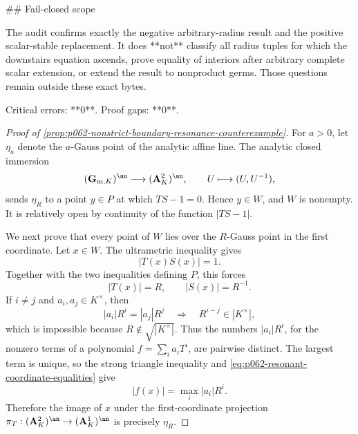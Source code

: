 ## Fail-closed scope

The audit confirms exactly the negative arbitrary-radius result and the
positive scalar-stable replacement. It does **not** classify all radius
tuples for which the downstairs equation ascends, prove equality of
interiors after arbitrary complete scalar extension, or extend the result
to nonproduct germs. Those questions remain outside these exact bytes.

Critical errors: **0**. Proof gaps: **0**.


\begin{proof}[Proof of
\cref{prop:p062-nonstrict-boundary-resonance-counterexample}]
For \(a>0\), let \(\eta_a\) denote the \(a\)-Gauss point of the analytic
affine line.  The analytic closed immersion
\[
 (\mathbf G_{\mathrm m,K})^{\an}\longrightarrow(\mathbf A^2_K)^{\an},
             \qquad U\longmapsto(U,U^{-1}),
\]
sends \(\eta_R\) to a point \(y\in P\) at which \(TS-1=0\).  Hence
\(y\in W\), and \(W\) is nonempty.  It is relatively open by continuity
of the function \(|TS-1|\).

We next prove that every point of \(W\) lies over the \(R\)-Gauss point in
the first coordinate.  Let \(x\in W\).  The ultrametric inequality gives
\[
                         |T(x)S(x)|=1.
\]
Together with the two inequalities defining \(P\), this forces
\begin{equation}\label{eq:p062-resonant-coordinate-equalities}
                         |T(x)|=R,
                         \qquad |S(x)|=R^{-1}.
\end{equation}
If \(i\ne j\) and \(a_i,a_j\in K^\times\), then
\[
 |a_i|R^i=|a_j|R^j
       \quad\Longrightarrow\quad
 R^{i-j}\in|K^\times|,
\]
which is impossible because \(R\notin\sqrt{|K^\times|}\).  Thus the
numbers \(|a_i|R^i\), for the nonzero terms of a polynomial
\(f=\sum_i a_iT^i\), are pairwise distinct.  The largest term is unique,
so the strong triangle inequality and
\eqref{eq:p062-resonant-coordinate-equalities} give
\begin{equation}\label{eq:p062-resonant-gauss-restriction}
                         |f(x)|=\max_i|a_i|R^i.
\end{equation}
Therefore the image of \(x\) under the first-coordinate projection
\(
 \pi_T:(\mathbf A^2_K)^{\an}\to(\mathbf A^1_K)^{\an}
\)
is precisely \(\eta_R\).


\end{proof}
